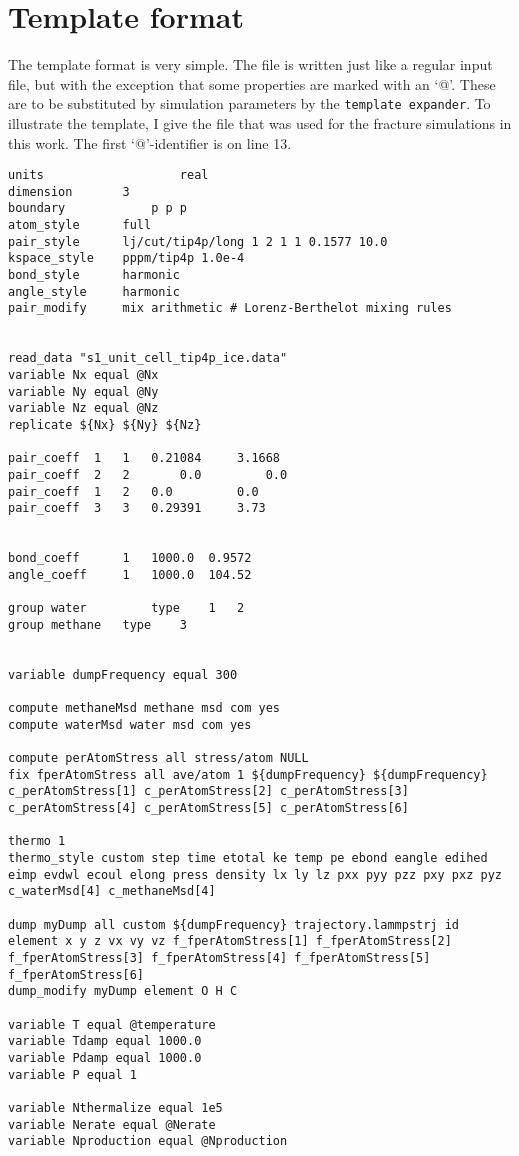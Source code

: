 \section{Template format}
The template format is very simple. The file is written just like a regular input file, but with the exception that some properties are marked with an `@'. These are to be substituted by simulation parameters by the {\tt template expander}.
To illustrate the template, I give the file that was used for the fracture simulations in this work. The first `@'-identifier is on line 13. 
\begin{lstlisting}[language=LammpsInput]
units					real
dimension 		3
boundary 			p p p 
atom_style 		full
pair_style 		lj/cut/tip4p/long 1 2 1 1 0.1577 10.0
kspace_style	pppm/tip4p 1.0e-4
bond_style 		harmonic
angle_style		harmonic
pair_modify		mix arithmetic # Lorenz-Berthelot mixing rules


read_data "s1_unit_cell_tip4p_ice.data"
variable Nx equal @Nx
variable Ny equal @Ny
variable Nz equal @Nz
replicate ${Nx} ${Ny} ${Nz}

pair_coeff 	1 	1 	0.21084 	3.1668
pair_coeff 	2 	2		0.0 		0.0
pair_coeff  1 	2 	0.0 		0.0
pair_coeff 	3 	3 	0.29391 	3.73


bond_coeff  	1 	1000.0 	0.9572
angle_coeff 	1 	1000.0 	104.52

group water 		type	1 	2
group methane 	type	3


variable dumpFrequency equal 300

compute methaneMsd methane msd com yes
compute waterMsd water msd com yes

compute perAtomStress all stress/atom NULL
fix fperAtomStress all ave/atom 1 ${dumpFrequency} ${dumpFrequency} c_perAtomStress[1] c_perAtomStress[2] c_perAtomStress[3] c_perAtomStress[4] c_perAtomStress[5] c_perAtomStress[6]

thermo 1
thermo_style custom step time etotal ke temp pe ebond eangle edihed eimp evdwl ecoul elong press density lx ly lz pxx pyy pzz pxy pxz pyz c_waterMsd[4] c_methaneMsd[4]

dump myDump all custom ${dumpFrequency} trajectory.lammpstrj id element x y z vx vy vz f_fperAtomStress[1] f_fperAtomStress[2] f_fperAtomStress[3] f_fperAtomStress[4] f_fperAtomStress[5] f_fperAtomStress[6] 
dump_modify myDump element O H C

variable T equal @temperature
variable Tdamp equal 1000.0
variable Pdamp equal 1000.0
variable P equal 1

variable Nthermalize equal 1e5
variable Nerate equal @Nerate
variable Nproduction equal @Nproduction


\end{lstlisting}

